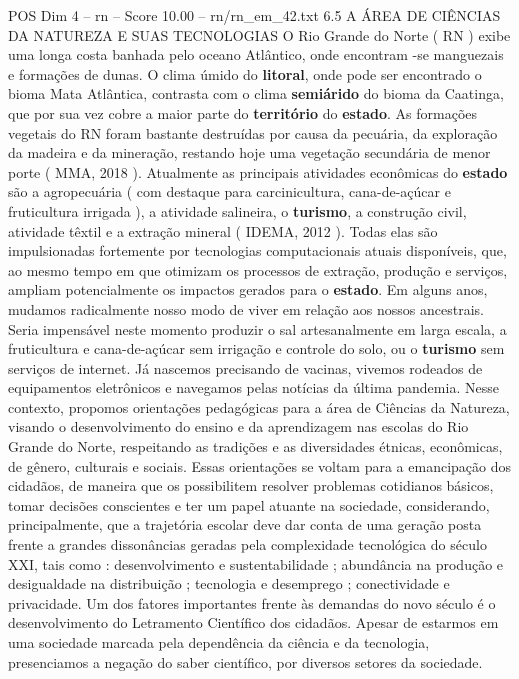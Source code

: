 \begin{textsample}{POS Dim 4 – rn – Score 10.00 – rn/rn\_em\_42.txt}  \label{ex:f4_pos_090}
6.5 A ÁREA DE CIÊNCIAS DA NATUREZA E SUAS TECNOLOGIAS O Rio Grande do Norte ( RN ) exibe uma longa costa banhada pelo oceano Atlântico, onde encontram -se manguezais e formações de dunas.
O clima úmido do \textbf{litoral}, onde pode ser encontrado o bioma Mata Atlântica, contrasta com o clima \textbf{semiárido} do bioma da Caatinga, que por sua vez cobre a maior parte do \textbf{território} do \textbf{estado}.
As formações vegetais do RN foram bastante destruídas por causa da pecuária, da exploração da madeira e da mineração, restando hoje uma vegetação secundária de menor porte ( MMA, 2018 ).
Atualmente as principais atividades econômicas do \textbf{estado} são a agropecuária ( com destaque para carcinicultura, cana-de-açúcar e fruticultura irrigada ), a atividade salineira, o \textbf{turismo}, a construção civil, atividade têxtil e a extração mineral ( IDEMA, 2012 ).
Todas elas são impulsionadas fortemente por tecnologias computacionais atuais disponíveis, que, ao mesmo tempo em que otimizam os processos de extração, produção e serviços, ampliam potencialmente os impactos gerados para o \textbf{estado}.
Em alguns anos, mudamos radicalmente nosso modo de viver em relação aos nossos ancestrais.
Seria impensável neste momento produzir o sal artesanalmente em larga escala, a fruticultura e cana-de-açúcar sem irrigação e controle do solo, ou o \textbf{turismo} sem serviços de internet.
Já nascemos precisando de vacinas, vivemos rodeados de equipamentos eletrônicos e navegamos pelas notícias da última pandemia.
Nesse contexto, propomos orientações pedagógicas para a área de Ciências da Natureza, visando o desenvolvimento do ensino e da aprendizagem nas escolas do Rio Grande do Norte, respeitando as tradições e as diversidades étnicas, econômicas, de gênero, culturais e sociais.
Essas orientações se voltam para a emancipação dos cidadãos, de maneira que os possibilitem resolver problemas cotidianos básicos, tomar decisões conscientes e ter um papel atuante na sociedade, considerando, principalmente, que a trajetória escolar deve dar conta de uma geração posta frente a grandes dissonâncias geradas pela complexidade tecnológica do século XXI, tais como : desenvolvimento e sustentabilidade ; abundância na produção e desigualdade na distribuição ; tecnologia e desemprego ; conectividade e privacidade.
Um dos fatores importantes frente às demandas do novo século é o desenvolvimento do Letramento Científico dos cidadãos.
Apesar de estarmos em uma sociedade marcada pela dependência da ciência e da tecnologia, presenciamos a negação do saber científico, por diversos setores da sociedade.

\end{textsample}
